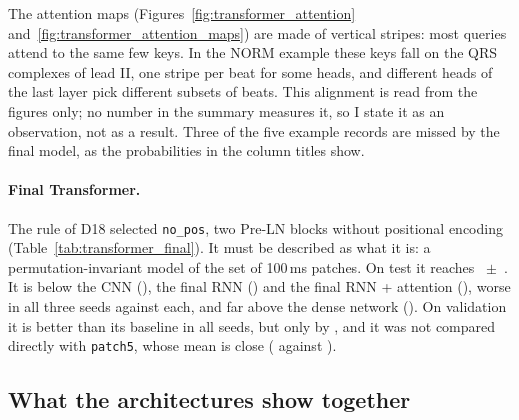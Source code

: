 


The attention maps (Figures~\ref{fig:transformer_attention} and~\ref{fig:transformer_attention_maps}) are
made of vertical stripes: most queries attend to the same few keys. In the NORM example these keys fall
on the QRS complexes of lead II, one stripe per beat for some heads, and different heads of the last
layer pick different subsets of beats. This alignment is read from the figures only; no number in the
summary measures it, so I state it as an observation, not as a result. Three of the five example records
are missed by the final model, as the probabilities in the column titles show.




\paragraph{Final Transformer.} The rule of D18 selected \texttt{no\_pos}, two Pre-LN blocks without
positional encoding (Table~\ref{tab:transformer_final}). It must be described as what it is: a
permutation-invariant model of the set of 100\,ms patches. On test it reaches
\transformerFinalTestMacroAurocMean{}~$\pm$~\transformerFinalTestMacroAurocSd{}. It is below the CNN
(\transformerDiffCnnMean{}), the final RNN (\transformerDiffRnnMean{}) and the final RNN + attention
(\transformerDiffRnnAttnMean{}), worse in all three seeds against each, and far above the dense network
(\transformerDiffDenseMean{}). On validation it is better than its baseline in all seeds, but only by
\transformerDiffMeanNoPos{}, and it was not compared directly with \texttt{patch5}, whose mean is close
(\transformerValAurocMeanPatchFive{} against \transformerValAurocMeanNoPos{}).



\subsection{What the architectures show together}\label{sec:arch-summary}


